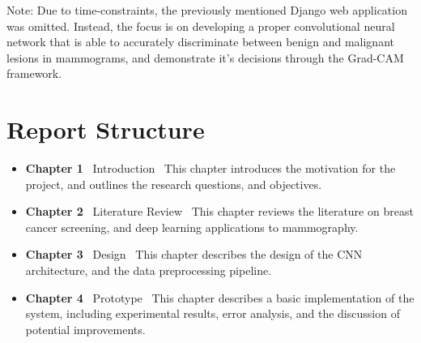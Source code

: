 \documentclass[main]{subfiles}
\begin{document}
\noindent Note: Due to time-constraints, the previously mentioned Django web application was omitted. Instead, the focus is on developing a proper convolutional neural network that is able to accurately discriminate between benign and malignant lesions in mammograms, and demonstrate it's decisions through the Grad-CAM framework.

\section{Report Structure}
\label{sec:intro_report_structure}
\begin{itemize}
	\item \textbf{Chapter 1} \textemdash\ Introduction \textemdash\ This chapter introduces the motivation for the project, and outlines the research questions, and objectives.
	\item \textbf{Chapter 2} \textemdash\ Literature Review \textemdash\ This chapter reviews the literature on breast cancer screening, and deep learning applications to mammography.
	\item \textbf{Chapter 3} \textemdash\ Design \textemdash\ This chapter describes the design of the CNN architecture, and the data preprocessing pipeline.
	\item \textbf{Chapter 4} \textemdash\ Prototype \textemdash\ This chapter describes a basic implementation of the system, including experimental results, error analysis, and the discussion of potential improvements.
\end{itemize}
\end{document}
